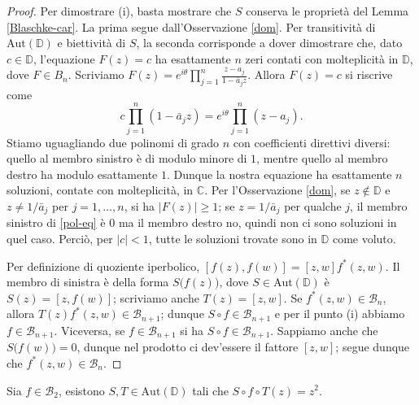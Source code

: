 \begin{proof}
  Per dimostrare (i), basta mostrare che $S$ conserva le proprietà del Lemma \ref{Blaschke-car}. La prima segue dall'Osservazione \ref{dom}. Per transitività di $\text{Aut}(\mathbb{D})$ e biettività di $S$, la seconda corrisponde a dover dimostrare che, dato $c \in \mathbb{D}$, l'equazione $F(z)=c$ ha esattamente $n$ zeri contati con molteplicità in $\mathbb{D}$, dove $F \in B_n$. Scriviamo $F(z)=\displaystyle e^{i\theta}\prod_{j=1}^n \frac{z-a_j}{1-\bar{a}_jz}$. Allora $F(z)=c$ si riscrive come
  \begin{equation} \label{pol-eq}
    c\prod_{j=1}^n (1-\bar{a}_jz)=e^{i\theta}\prod_{j=1}^n(z-a_j).
  \end{equation}
  Stiamo uguagliando due polinomi di grado $n$ con coefficienti direttivi diversi: quello al membro sinistro è di modulo minore di $1$, mentre quello al membro destro ha modulo esattamente $1$. Dunque la nostra equazione ha esattamente $n$ soluzioni, contate con molteplicità, in $\mathbb{C}$.
  Per l'Osservazione \ref{dom}, se $z \not\in \mathbb{D}$ e $z\not=1/\bar{a}_j$ per $j=1,\dots,n$, si ha $|F(z)| \ge 1$; se $z=1/\bar{a}_j$ per qualche $j$, il membro sinistro di \eqref{pol-eq} è $0$ ma il membro destro no, quindi non ci sono soluzioni in quel caso. Perciò, per $|c|<1$, tutte le soluzioni trovate sono in $\mathbb{D}$ come voluto.

  Per definizione di quoziente iperbolico, $[f(z),f(w)]=[z,w]f^*(z,w)$. Il membro di sinistra è della forma $S\bigl(f(z)\bigr)$, dove $S \in \text{Aut}(\mathbb{D})$ è $S(z)=[z,f(w)]$; scriviamo anche $T(z)=[z,w]$.
  Se $f^*(z,w) \in \mathcal{B}_n$, allora $T(z)f^*(z,w) \in \mathcal{B}_{n+1}$; dunque $S\circ f \in \mathcal{B}_{n+1}$ e per il punto (i) abbiamo $f \in \mathcal{B}_{n+1}$. Viceversa, se $f \in \mathcal{B}_{n+1}$ si ha $S\circ f \in \mathcal{B}_{n+1}$.
  Sappiamo anche che $S\bigl(f(w)\bigr)=0$, dunque nel prodotto ci dev'essere il fattore $[z,w]$; segue dunque che $f^*(z,w) \in \mathcal{B}_n$.
\end{proof}

\begin{lm} \label{z^2}
  Sia $f \in \mathcal{B}_2$, esistono $S, T \in \text{Aut}(\mathbb{D})$ tali che $S\circ f\circ T(z)=z^2$.
\end{lm}

